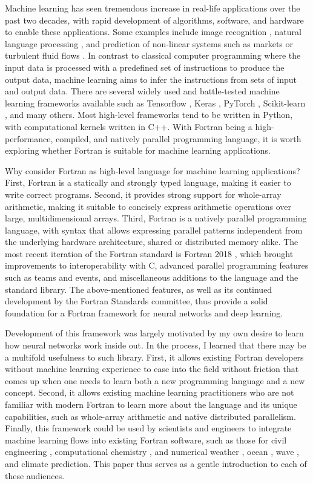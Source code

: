 \documentclass[sigplan, review=false, screen=true, balance=true]{acmart}
\begin{document}
Machine learning has seen tremendous increase in real-life applications
over the past two decades, with rapid development of algorithms, software,
and hardware to enable these applications. Some examples include image
recognition \citep{krizhevsky09}, natural language processing \citep{goldberg16},
and prediction of non-linear systems such as markets \citep{kimoto90} or
turbulent fluid flows \citep{kutz17}.
In contrast to classical computer programming where the input data is processed
with a predefined set of instructions to produce the output data, machine
learning aims to infer the instructions from sets of input and output data.
There are several widely used and battle-tested machine learning frameworks
available such as Tensorflow \citep{abadi16}, Keras \citep{chollet15},
PyTorch \citep{paszke17}, Scikit-learn \citep{pendregosa11}, and many others.
Most high-level frameworks tend to be written in Python, with computational
kernels written in C++. With Fortran being a high-performance, compiled, and
natively parallel programming language, it is worth exploring whether Fortran
is suitable for machine learning applications.

Why consider Fortran as high-level language for machine learning applications?
First, Fortran is a statically and strongly typed language, making it
easier to write correct programs. Second, it provides strong support for whole-array
arithmetic, making it suitable to concisely express arithmetic operations over
large, multidimensional arrays. Third, Fortran is a natively parallel
programming language, with syntax that allows expressing parallel patterns
independent from the underlying hardware architecture, shared or distributed
memory alike. The most recent iteration of the Fortran standard is Fortran 2018
\citep{reid18}, which brought improvements to interoperability with C,
advanced parallel programming features such as teams and events, and
miscellaneous additions to the language and the standard library.
The above-mentioned features, as well as its continued development by
the Fortran Standards committee, thus provide a solid foundation for a
Fortran framework for neural networks and deep learning.

Development of this framework was largely motivated by my own desire to learn
how neural networks work inside out. In the process, I learned that there
may be a multifold usefulness to such library. First, it allows existing
Fortran developers without machine learning experience to ease into the field
without friction that comes up when one needs to learn both a new programming
language and a new concept.
Second, it allows existing machine learning practitioners who are not
familiar with modern Fortran to learn more about the language and its unique
capabilities, such as whole-array arithmetic and native distributed parallelism.
Finally, this framework could be used by scientists and engineers
to integrate machine learning flows into existing Fortran software, such as
those for civil engineering \citep{fischer08},
computational chemistry \citep{valiev10},
and numerical weather \citep{powers17}, ocean \citep{chassignet06},
wave \citep{donelan12}, and climate \citep{hurell13} prediction.
This paper thus serves as a gentle introduction to each of these audiences.
\end{document}
